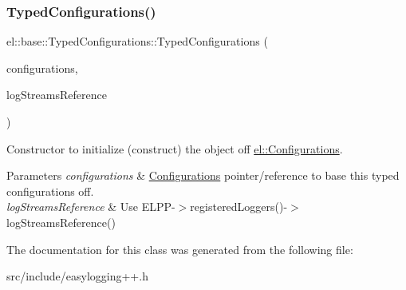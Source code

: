 \subsubsection{\texorpdfstring{Typed\+Configurations()}{TypedConfigurations()}}
{\footnotesize\ttfamily el\+::base\+::\+Typed\+Configurations\+::\+Typed\+Configurations (\begin{DoxyParamCaption}\item[{\hyperlink{classel_1_1_configurations}{Configurations} $\ast$}]{configurations,  }\item[{base\+::\+Log\+Streams\+Reference\+Map $\ast$}]{log\+Streams\+Reference }\end{DoxyParamCaption})\hspace{0.3cm}{\ttfamily [inline]}}



Constructor to initialize (construct) the object off \hyperlink{classel_1_1_configurations}{el\+::\+Configurations}. 


\begin{DoxyParams}{Parameters}
{\em configurations} & \hyperlink{classel_1_1_configurations}{Configurations} pointer/reference to base this typed configurations off. \\
\hline
{\em log\+Streams\+Reference} & Use E\+L\+P\+P-\/$>$registered\+Loggers()-\/$>$log\+Streams\+Reference() \\
\hline
\end{DoxyParams}


The documentation for this class was generated from the following file\+:\begin{DoxyCompactItemize}
\item 
src/include/easylogging++.\+h\end{DoxyCompactItemize}
